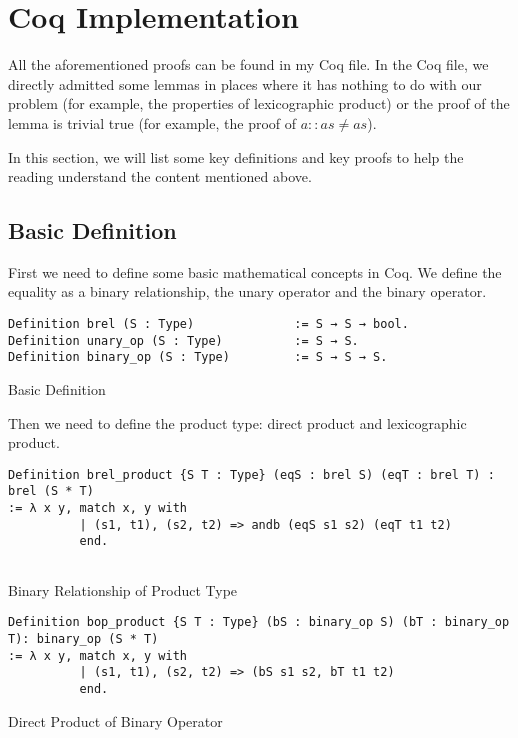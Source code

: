 \section{Coq Implementation}
All the aforementioned proofs can be found in my Coq file.
In the Coq file, we directly admitted some lemmas in places where it has nothing to do with our problem (for example, the properties of lexicographic product) or the proof of the lemma is trivial true (for example, the proof of $a::as \neq as$).

In this section, we will list some key definitions and key proofs to help the reading understand the content mentioned above.

\subsection{Basic Definition}
First we need to define some basic mathematical concepts in Coq. We define the equality as a binary relationship, the unary operator and the binary operator.
\begin{listing}[H]
\begin{verbatim}
Definition brel (S : Type)              := S → S → bool.
Definition unary_op (S : Type)          := S → S. 
Definition binary_op (S : Type)         := S → S → S. 
\end{verbatim}
\caption{Basic Definition} 
\label{coq:def:basic}
\end{listing}

Then we need to define the product type: direct product and lexicographic product.
\begin{listing}[H]
\begin{verbatim}
Definition brel_product {S T : Type} (eqS : brel S) (eqT : brel T) : brel (S * T)
:= λ x y, match x, y with
          | (s1, t1), (s2, t2) => andb (eqS s1 s2) (eqT t1 t2) 
          end.
        
\end{verbatim}
\caption{Binary Relationship of Product Type} 
\label{coq:def:product_relationship}
\end{listing}

\begin{listing}[H]
\begin{verbatim}
Definition bop_product {S T : Type} (bS : binary_op S) (bT : binary_op T): binary_op (S * T) 
:= λ x y, match x, y with
          | (s1, t1), (s2, t2) => (bS s1 s2, bT t1 t2) 
          end.
\end{verbatim}
\caption{Direct Product of Binary Operator} 
\label{coq:def:direct_product}
\end{listing}

